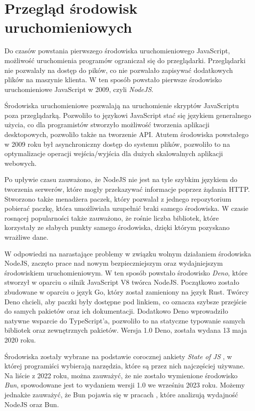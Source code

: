 \section{Przegląd środowisk uruchomieniowych}\label{env}
Do czasów powstania pierwszego środowiska uruchomieniowego JavaScript, możliwość uruchomienia programów ograniczał się do przeglądarki. Przeglądarki nie pozwalały na dostęp do pików, co nie pozwalało zapisywać dodatkowych plików na maszynie klienta. W ten sposób powstało pierwsze środowisko uruchomieniowe JavaScript w 2009, czyli \textit{NodeJS}.

Środowiska uruchomieniowe pozwalają na uruchomienie skryptów JavaScriptu poza przeglądarką. Pozwoliło to językowi JavaScript stać się językiem generalnego użycia, co dla programistów stworzyło możliwość tworzenia aplikacji desktopowych, pozwoliło także na tworzenie API. Atutem środowiska powstałego w 2009 roku był asynchroniczny dostęp do systemu plików, pozwoliło to na optymalizacje operacji wejścia/wyjścia dla dużych skalowalnych aplikacji webowych.

Po upływie czasu zauważono, że NodeJS nie jest na tyle szybkim językiem do tworzenia serwerów, które mogły przekazywać informacje poprzez żądania HTTP. Stworzono także menadżera paczek, który pozwalał z jednego repozytorium pobierać paczkę, która umożliwiała uzupełnić braki samego środowiska. W czasie rosnącej popularności także zauważono, że rośnie liczba bibliotek, które korzystały ze słabych punkty samego środowiska, dzięki którym pozyskano wrażliwe dane.

W odpowiedzi na narastające problemy w związku wolnym działaniem środowiska NodeJS, zaczęto prace nad nowym bezpieczniejszym oraz wydajniejszym środowiskiem uruchomieniowym. W ten sposób powstało środowisko \textit{Deno}, które stworzył w oparciu o silnik JavaScript V8 twórca NodeJS. Początkowo zostało zbudowane w oparciu o język Go, który został zamieniony na język Rust. Twórcy Deno chcieli, aby paczki były dostępne pod linkiem, co oznacza szybsze przejście do samych pakietów oraz ich dokumentacji. Dodatkowo Deno wprowadziło natywne wsparcie do TypeScript'a, pozwoliło to na statyczne typowanie samych bibliotek oraz zewnętrznych pakietów. Wersja 1.0 Deno, została wydana 13 maja 2020 roku.

Środowiska zostały wybrane na podstawie corocznej ankiety \textit{State of JS} \cite{State_of_js:2022}, w której programiści wybierają narzędzia, które są przez nich najczęściej używane. Na liście z 2022 roku, można zauważyć, że nie zostało wymienione środowisko \textit{Bun}, spowodowane jest to wydaniem wersji 1.0 we wrześniu 2023 roku. Możemy jednakże zauważyć, że Bun pojawia się w pracach \cite{NodeAndBun}, które analizują wydajność NodeJS oraz Bun.

